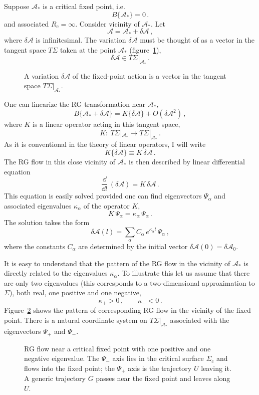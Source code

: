 Suppose $\mathcal A_*$ is a critical fixed point, i.e.
\[
B\{\mathcal A_*\}=0\,.
\]
and associated $R_c=\infty$. Consider vicinity of $\mathcal A_*$. Let
\[
\mathcal A=\mathcal A_*+\delta\mathcal A\,,
\]
where $\delta\mathcal A$ is infinitesimal. The variation $\delta\mathcal A$ must be
thought of as a vector in the tangent space $T\Sigma$ taken at the point
$\mathcal A_*$ (figure~\ref{fig:tangent}),
\[
\delta\mathcal A\in T\Sigma|_{\mathcal A_*}\,.
\]
\begin{figure}[ht]
\centering{}
\caption{A variation $\delta\mathcal A$ of the fixed-point action is a vector in
the tangent space $T\Sigma|_{\mathcal A_*}$.}
\label{fig:tangent}
\end{figure}
One can linearize the RG transformation near $\mathcal A_*$,
\[
B\{\mathcal A_*+\delta\mathcal A\}=K\{\delta\mathcal A\}+O(\delta\mathcal A^2)\,,
\]
where $K$ is a linear operator acting in this tangent space,
\[
K:\ T\Sigma|_{\mathcal A_*}\to T\Sigma|_{\mathcal A_*}\,.
\]
As it is conventional in the theory of linear operators, I will write
\begin{equation}\label{eq:Klin}
K\{\delta\mathcal A\}\equiv K\,\delta\mathcal A\,.
\end{equation}
The RG flow in this close vicinity of $\mathcal A_*$ is then described by linear
differential equation
\[
\frac{\dd}{\dd l}\,(\delta\mathcal A)=K\,\delta\mathcal A\,.
\]
This equation is easily solved provided one can find eigenvectors $\Psi_\alpha$
and associated eigenvalues $\kappa_\alpha$ of the operator $K$,
\[
K\,\Psi_\alpha=\kappa_\alpha\,\Psi_\alpha\,.
\]
The solution takes the form
\begin{equation}\label{eq:linsol}
\delta\mathcal A(l)=\sum_\alpha C_\alpha\,e^{\kappa_\alpha l}\,\Psi_\alpha\,,
\end{equation}
where the constants $C_\alpha$ are determined by the initial vector
$\delta\mathcal A(0)=\delta\mathcal A_0$.

It is easy to understand that the pattern of the RG flow in the vicinity of
$\mathcal A_*$ is directly related to the eigenvalues $\kappa_\alpha$. To
illustrate this let us assume that there are only two eigenvalues (this
corresponds to a two-dimensional approximation to $\Sigma$), both real, one
positive and one negative,
\[
\kappa_+>0\,,\qquad\kappa_-<0\,.
\]
Figure~\ref{fig:saddle} shows the pattern of corresponding RG flow in the vicinity
of the fixed point. There is a natural coordinate system on
$T\Sigma|_{\mathcal A_*}$ associated with the eigenvectors $\Psi_+$ and $\Psi_-$.
\begin{figure}[ht]
\centering{}
\caption{RG flow near a critical fixed point with one positive and one negative
eigenvalue. The $\Psi_-$ axis lies in the critical surface $\Sigma_c$ and flows
into the fixed point; the $\Psi_+$ axis is the trajectory $U$ leaving it. A
generic trajectory $G$ passes near the fixed point and leaves along $U$.}
\label{fig:saddle}
\end{figure}

